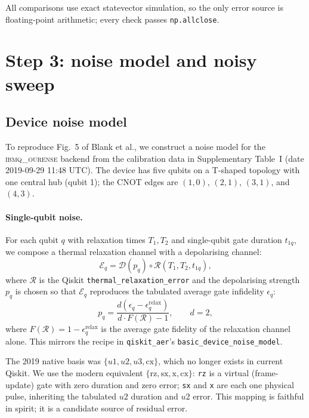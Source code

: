 \documentclass[11pt,a4paper]{article}
\begin{document}
All comparisons use exact statevector simulation, so the only error source
is floating-point arithmetic; every check passes \texttt{np.allclose}.

\section{Step 3: noise model and noisy sweep}
\label{sec:noise}

\subsection{Device noise model}

To reproduce Fig.~5 of Blank et al., we construct a noise model for the
\textsc{ibmq\_ourense} backend from the calibration data in Supplementary
Table~I (date 2019-09-29 11:48 UTC). The device has five qubits on a
T-shaped topology with one central hub (qubit 1); the CNOT edges are
$(1,0)$, $(2,1)$, $(3,1)$, and $(4,3)$.

\paragraph{Single-qubit noise.} For each qubit $q$ with relaxation times
$T_1, T_2$ and single-qubit gate duration $t_{1q}$, we compose a thermal
relaxation channel with a depolarising channel:
\begin{equation}
  \mathcal{E}_q = \mathcal{D}(p_q) \circ \mathcal{R}(T_1, T_2, t_{1q}),
\end{equation}
where $\mathcal{R}$ is the Qiskit \texttt{thermal\_relaxation\_error} and
the depolarising strength $p_q$ is chosen so that
$\mathcal{E}_q$ reproduces the tabulated average gate infidelity
$\epsilon_q$:
\begin{equation}
  p_q = \frac{d(\epsilon_q - \epsilon_q^{\text{relax}})}{d \cdot F(\mathcal{R}) - 1},
  \qquad d = 2,
\end{equation}
where $F(\mathcal{R}) = 1 - \epsilon_q^{\text{relax}}$ is the average gate
fidelity of the relaxation channel alone. This mirrors the recipe in
\texttt{qiskit\_aer}'s \texttt{basic\_device\_noise\_model}.

The 2019 native basis was $\{u1, u2, u3, \mathrm{cx}\}$, which no longer
exists in current Qiskit. We use the modern equivalent
$\{\mathrm{rz}, \mathrm{sx}, \mathrm{x}, \mathrm{cx}\}$: \texttt{rz} is a
virtual (frame-update) gate with zero duration and zero error; \texttt{sx}
and \texttt{x} are each one physical pulse, inheriting the tabulated $u2$
duration and $u2$ error. This mapping is faithful in spirit; it is a
candidate source of residual error.
\end{document}
